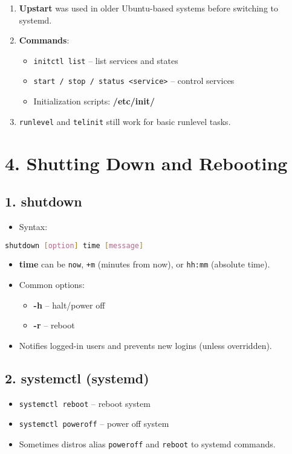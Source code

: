 \documentclass[a4paper]{report}
\begin{document}
\begin{enumerate}
    \item \textbf{Upstart} was used in older Ubuntu-based systems before switching to systemd.
    \item \textbf{Commands}:
    \begin{itemize}
        \item \texttt{initctl list} – list services and states
        \item \texttt{start / stop / status <service>} – control services
        \item Initialization scripts: \textbf{/etc/init/}
    \end{itemize}
    \item \texttt{runlevel} and \texttt{telinit} still work for basic runlevel tasks.
\end{enumerate}

\section*{4. Shutting Down and Rebooting}

\subsection*{1. shutdown}
\begin{itemize}
    \item Syntax:
\end{itemize}

\begin{lstlisting}[language=bash]
shutdown [option] time [message]
\end{lstlisting}

\begin{itemize}
    \item \textbf{time} can be \texttt{now}, \texttt{+m} (minutes from now), or \texttt{hh:mm} (absolute time).
    \item Common options:
    \begin{itemize}
        \item \textbf{-h} – halt/power off
        \item \textbf{-r} – reboot
    \end{itemize}
    \item Notifies logged-in users and prevents new logins (unless overridden).
\end{itemize}

\subsection*{2. systemctl (systemd)}
\begin{itemize}
    \item \texttt{systemctl reboot} – reboot system
    \item \texttt{systemctl poweroff} – power off system
    \item Sometimes distros alias \texttt{poweroff} and \texttt{reboot} to systemd commands.
\end{itemize}
\end{document}
